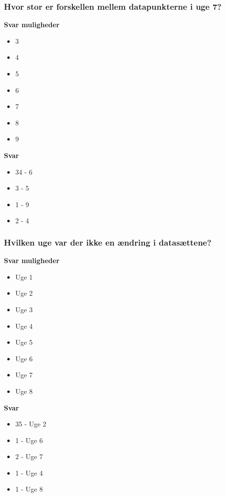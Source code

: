 \subsubsection{Hvor stor er forskellen mellem datapunkterne i uge 7?}
\textbf{Svar muligheder}
\begin{itemize}
    \item 3
    \item 4
    \item 5
    \item 6
    \item 7
    \item 8
    \item 9
\end{itemize}

\textbf{Svar}
\begin{itemize}
    \item 34 - 6
    \item 3 - 5
    \item 1 - 9
    \item 2 - 4
\end{itemize}

\subsubsection{Hvilken uge var der ikke en ændring i datasættene?}
\textbf{Svar muligheder}
\begin{itemize}
    \item Uge 1
    \item Uge 2
    \item Uge 3
    \item Uge 4
    \item Uge 5
    \item Uge 6
    \item Uge 7
    \item Uge 8
\end{itemize}

\textbf{Svar}
\begin{itemize}
    \item 35 - Uge 2
    \item 1 - Uge 6
    \item 2 - Uge 7
    \item 1 - Uge 4
    \item 1 - Uge 8
\end{itemize}

